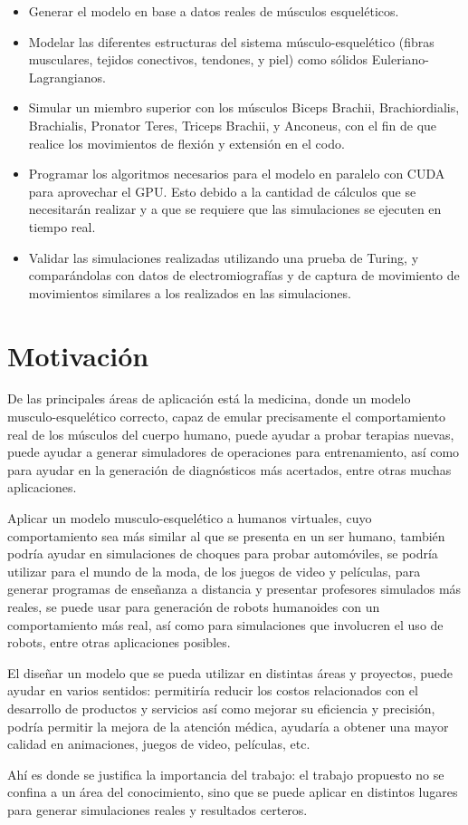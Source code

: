 \begin{itemize}
	\item Generar el modelo en base a datos reales de músculos esqueléticos.
	\item Modelar las diferentes estructuras del sistema músculo-esquelético (fibras musculares, tejidos conectivos, tendones, y piel) como sólidos Euleriano-Lagrangianos.
	\item Simular un miembro superior con los músculos Biceps Brachii, Brachiordialis, Brachialis, Pronator Teres, Triceps Brachii, y Anconeus, con el fin de que realice los movimientos de flexión y extensión en el codo.
	\item Programar los algoritmos necesarios para el modelo en paralelo con CUDA para aprovechar el GPU. Esto debido a la cantidad de cálculos que se necesitarán realizar y a que se requiere que las simulaciones se ejecuten en tiempo real.
	\item Validar las simulaciones realizadas utilizando una prueba de Turing, y comparándolas con datos de electromiografías y de captura de movimiento de movimientos similares a los realizados en las simulaciones.
\end{itemize}

\section{Motivación}

De las principales áreas de aplicación está la medicina, donde un modelo musculo-esquelético correcto, capaz de emular precisamente el comportamiento real de los  músculos del cuerpo humano, puede ayudar a probar terapias nuevas, puede ayudar a generar simuladores de operaciones para entrenamiento, así como para ayudar en la generación de diagnósticos más acertados, entre otras muchas aplicaciones. 

Aplicar un modelo musculo-esquelético a humanos virtuales, cuyo comportamiento sea más similar al que se presenta en un ser humano, también podría ayudar en simulaciones de choques para probar automóviles, se podría utilizar para el mundo de la moda, de los juegos de video y películas, para generar programas de enseñanza a distancia y presentar profesores simulados más reales, se puede usar para generación de robots humanoides con un comportamiento más real, así como para simulaciones que involucren el uso de robots, entre otras aplicaciones posibles.

El diseñar un modelo que se pueda utilizar en distintas áreas y proyectos, puede ayudar en varios sentidos: permitiría reducir los costos relacionados con el desarrollo de productos y servicios así como mejorar su eficiencia y precisión, podría permitir la mejora de la atención médica, ayudaría a obtener una mayor calidad en animaciones, juegos de video, películas, etc.

Ahí es donde se justifica la importancia del trabajo: el trabajo propuesto no se confina a un área del conocimiento, sino que se puede aplicar en distintos lugares para generar simulaciones reales y resultados certeros.

